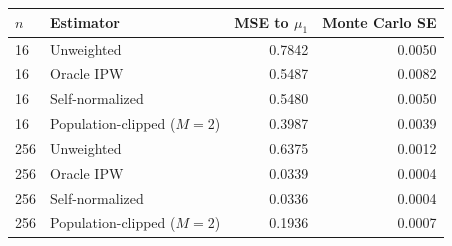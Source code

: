 \begin{tabular}{llrr}
\toprule
$n$ & Estimator & MSE to $\mu_1$ & Monte Carlo SE \\
\midrule
16 & Unweighted & 0.7842 & 0.0050 \\
16 & Oracle IPW & 0.5487 & 0.0082 \\
16 & Self-normalized & 0.5480 & 0.0050 \\
16 & Population-clipped ($M=2$) & 0.3987 & 0.0039 \\
\midrule
256 & Unweighted & 0.6375 & 0.0012 \\
256 & Oracle IPW & 0.0339 & 0.0004 \\
256 & Self-normalized & 0.0336 & 0.0004 \\
256 & Population-clipped ($M=2$) & 0.1936 & 0.0007 \\
\bottomrule
\end{tabular}
